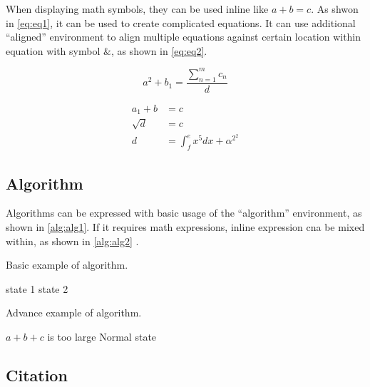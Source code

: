 When displaying math symbols, they can be used inline like $a+b=c$. As shwon in \autoref{eq:eq1}, it can be used to create complicated equations. It can use additional \enquote{aligned} environment to align multiple equations against certain location within equation with symbol $\&$, as shown in \autoref{eq:eq2}.

\begin{equation}
    a^2+b_1=\dfrac{\sum\limits^{m}_{n=1}c_n}{d}
    \label{eq:eq1}
\end{equation}

\begin{equation}
    \begin{aligned}
        a_1+b&=c \\
        \sqrt{d}&=c \\
        d&=\int^e_fx^5dx+\alpha^{2^2}
    \label{eq:eq2}
    \end{aligned}
\end{equation}

\subsection{Algorithm}

Algorithms can be expressed with basic usage of the \enquote{algorithm} environment, as shown in \autoref{alg:alg1}. If it requires math expressions, inline expression cna be mixed within, as shown in \autoref{alg:alg2} \cite{overleaf_alg}.

\begin{algorithm}
    \caption{Basic example of algorithm.}
    \label{alg:alg1}
    \begin{algorithmic}
            \State state 1
        \Else
            \State state 2
        \EndIf
    \end{algorithmic}
\end{algorithm}

\begin{algorithm}
    \caption{Advance example of algorithm.}
    \label{alg:alg2}
    \begin{algorithmic}
            \State $a+b+c$ is too large
        \Else
            \State Normal state
        \EndIf
    \end{algorithmic}
\end{algorithm}

\subsection{Citation}

